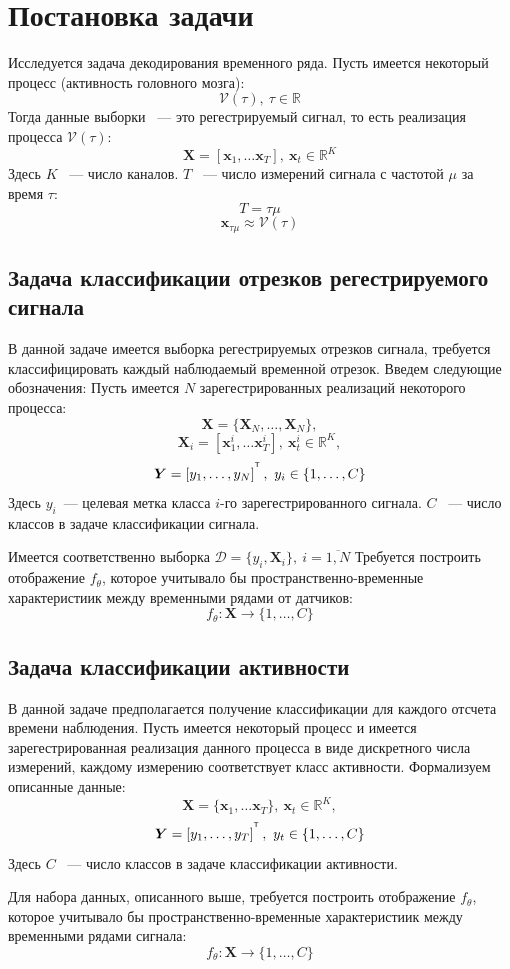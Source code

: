 \documentclass[a4paper, 12pt]{extarticle}
\begin{document}
\section{Постановка задачи}
Исследуется задача декодирования временного ряда. Пусть имеется некоторый процесс (активность головного мозга):
$$\mathcal{V}(\tau),~\tau \in \mathbb{R}$$
Тогда данные выборки ~--- это регестрируемый сигнал, то есть реализация процесса $\mathcal{V}(\tau)$:
$$\bm{X} = \left[\bm{x}_1,\dots \bm{x}_{T}\right],~\bm{x}_t \in \mathbb{R}^K$$
Здесь $K$ ~--- число каналов. $T$ ~--- число измерений сигнала с частотой $\mu$ за время $\tau$:
$$T = \tau \mu$$
$$\bm{x}_{\tau \mu} \approx \mathcal{V}(\tau)$$
\subsection{Задача классификации отрезков регестрируемого сигнала}
В данной задаче имеется выборка регестрируемых отрезков сигнала, 
требуется классифицировать каждый наблюдаемый временной отрезок. 
Введем следующие обозначения:
Пусть имеется $N$ зарегестрированных реализаций некоторого процесса:
$$\bm{X} = \{\bm{X}_N,\dots, \bm{X}_N\},$$
$$\bm{X}_i = \left[\bm{x}^i_1,\dots \bm{x}^i_{T}\right], ~\bm{x}^i_t \in \mathbb{R}^K,$$
$$\bm{Y} = \left[y_1, \dots, y_{N}\right]^{^{\mathsf{T}}},~y_i \in \{1,\dots, C\}$$
Здесь $y_i$~--- целевая метка класса $i$-го зарегестрированного сигнала. $C$ ~--- число классов в задаче классификации сигнала. 

Имеется соответственно выборка $\mathcal{D} = \{y_i, \bm{X}_i\},~  i = \overline{1,N}$
Требуется построить отображение $f_\theta$, которое учитывало 
бы пространственно-временные характеристиик между временными рядами от датчиков:
$$f_\theta: \bm{X} \rightarrow \{1,\dots, C\}$$ 
\subsection{Задача классификации активности}
В данной задаче предполагается получение классификации для каждого отсчета 
времени наблюдения.
Пусть имеется некоторый процесс и имеется зарегестрированная реализация данного 
процесса в виде дискретного числа измерений, каждому измерению соответствует
класс активности. Формализуем описанные данные:
$$\bm{X} = \{\bm{x}_1,\dots \bm{x}_{T}\}, ~\bm{x}_t \in \mathbb{R}^K,$$
$$\bm{Y} = \left[y_1, \dots, y_{T}\right]^{^{\mathsf{T}}},~y_t \in \{1,\dots, C\}$$
Здесь $C$ ~--- число классов в задаче классификации активности. 

Для набора данных, описанного выше, требуется построить отображение $f_\theta$, которое учитывало 
бы пространственно-временные характеристиик между временными рядами сигнала:
$$f_\theta: \bm{X} \rightarrow \{1,\dots, C\}$$ 
\end{document}
